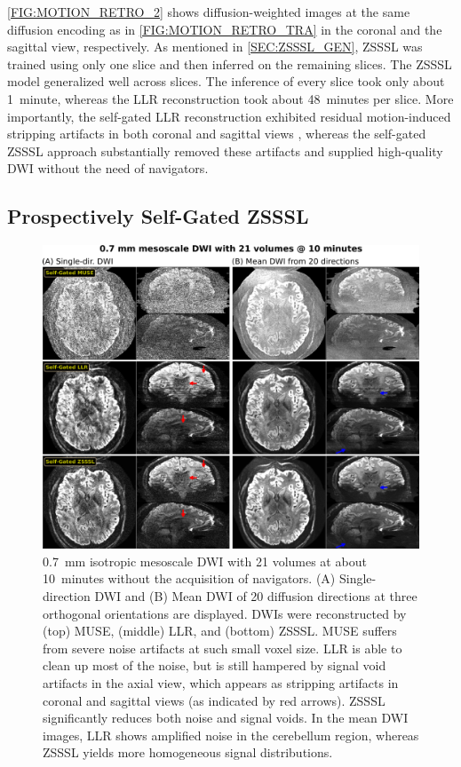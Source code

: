 \documentclass[journal,twoside,web]{ieeecolor}
\begin{document}
	\cref{FIG:MOTION_RETRO_2} shows diffusion-weighted images
	at the same diffusion encoding as in \cref{FIG:MOTION_RETRO_TRA}
	in the coronal and the sagittal view, respectively.
	As mentioned in \cref{SEC:ZSSSL_GEN}, ZSSSL was trained using only one slice
	and then inferred on the remaining slices.
	The ZSSSL model generalized well across slices.
	The inference of every slice took only about 1~minute, 
	whereas the LLR reconstruction took about 48~minutes per slice.
	More importantly, the self-gated LLR reconstruction exhibited residual 
	motion-induced stripping artifacts 
	in both coronal and sagittal views \cite{chang_2021_musium},
	whereas the self-gated ZSSSL approach substantially removed these artifacts
	and supplied high-quality DWI without the need of navigators.
	
	\subsection{Prospectively Self-Gated ZSSSL}
	
	\begin{figure}
		\centering
		\includegraphics[width=\textwidth]{../figures/fig4.png}
		\caption{0.7~mm isotropic mesoscale DWI with 21 volumes at about 10~minutes 
			without the acquisition of navigators. 
			(A) Single-direction DWI and 
			(B) Mean DWI of 20 diffusion directions 
			at three orthogonal orientations are displayed.
			DWIs were reconstructed by 
			(top) MUSE, (middle) LLR, and (bottom) ZSSSL.
			MUSE suffers from severe noise artifacts at such small voxel size.
			LLR is able to clean up most of the noise, 
			but is still hampered by signal void artifacts in the axial view, 
			which appears as stripping artifacts in coronal and sagittal views 
			(as indicated by red arrows).
			ZSSSL significantly reduces both noise and signal voids.
			In the mean DWI images, LLR shows amplified noise 
			in the cerebellum region, 
			whereas ZSSSL yields more homogeneous signal distributions.}
		\label{FIG:MOTION_PROS}
	\end{figure}
	
\end{document}
